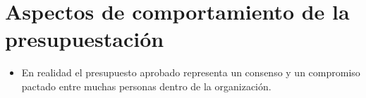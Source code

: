 \documentclass{article}
\begin{document}
\section{Aspectos de comportamiento de la presupuestación}
\begin{itemize}
    \item En realidad el presupuesto aprobado representa un consenso y un compromiso pactado entre muchas personas dentro de la organización.
\end{itemize}























\end{document}
